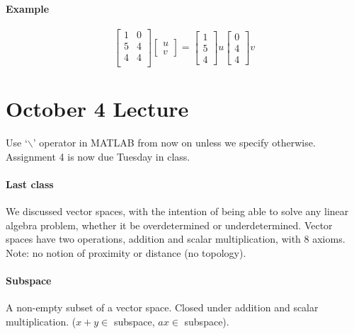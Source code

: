 \documentclass[12pt]{article}
\newcommand{\<}{\langle}
\renewcommand{\>}{\rangle}
\begin{document}
\paragraph{Example}

\[
	\begin{bmatrix}
		1 & 0 \\ 5 & 4 \\ 4 & 4 \\
	\end{bmatrix}
	\begin{bmatrix}
		u \\ v
	\end{bmatrix} 
	=
	\begin{bmatrix}
		1 \\ 5 \\ 4
	\end{bmatrix} u
	\begin{bmatrix}
		0 \\ 4 \\ 4
	\end{bmatrix} v
\]

\section{October 4 Lecture}

Use `$\backslash$' operator in MATLAB from now on unless we specify otherwise. Assignment 4 is now due Tuesday in class.

\paragraph{Last class} We discussed vector spaces, with the intention of being able to solve any linear algebra problem, whether it be overdetermined or underdetermined. Vector spaces have two operations, addition and scalar multiplication, with 8 axioms. Note: no notion of proximity or distance (no topology).

\paragraph{Subspace} A non-empty subset of a vector space. Closed under addition and scalar multiplication. ($x+y \in$ subspace, $ax \in$ subspace).
\end{document}

